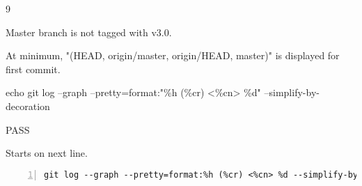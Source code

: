 \begin{description}[align=right,leftmargin=3.2cm,labelindent=3.0cm]
\item[Step:] 9
\item[Confirm:] Master branch is not tagged with v3.0.
\item[Expectation:] At minimum, "(HEAD, origin/master, origin/HEAD, master)" is displayed for first commit.
\item[Command:] echo git  log --graph --pretty=format:"\%h (\%cr) <\%cn> \%d" --simplify-by-decoration
\item[Test Result:] PASS
\item[Evidence:] Starts on next line.
\end{description}
\begin{lstlisting}[numbers=left]
git log --graph --pretty=format:%h (%cr) <%cn> %d --simplify-by-decoration

\end{lstlisting}
